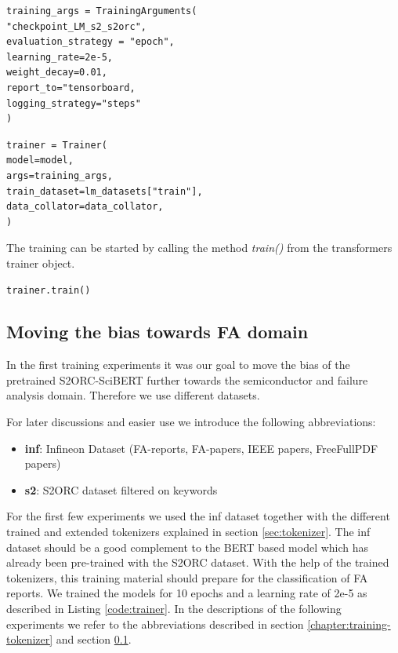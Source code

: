 \begin{code}
	\label{code:train_args}
\begin{verbatim}
training_args = TrainingArguments(
"checkpoint_LM_s2_s2orc",
evaluation_strategy = "epoch",
learning_rate=2e-5,
weight_decay=0.01,
report_to="tensorboard,
logging_strategy="steps"
)
\end{verbatim}
\end{code}

\begin{code}
	\label{code:trainer}
\begin{verbatim}
trainer = Trainer(
model=model,
args=training_args,
train_dataset=lm_datasets["train"],
data_collator=data_collator,
)
\end{verbatim}
\end{code}

The training can be started by calling the method \textit{train()} from the transformers trainer object.
\begin{code}
	\label{code:train}
\begin{verbatim}
trainer.train()
\end{verbatim}
\end{code}

\subsection{Moving the bias towards FA domain}\label{chapter:training-experiments}
In the first training experiments it was our goal to move the bias of the pretrained S2ORC-SciBERT further towards the semiconductor and failure analysis domain. Therefore we use different datasets. 

For later discussions and easier use we introduce the following abbreviations:
\begin{itemize}
	\item \textbf{inf}: Infineon Dataset (FA-reports, FA-papers, IEEE papers, FreeFullPDF papers)
	\item \textbf{s2}: S2ORC dataset filtered on keywords
\end{itemize}

For the first few experiments we used the inf dataset together with the different trained and extended tokenizers explained in section \ref{sec:tokenizer}. The inf dataset should be a good complement to the BERT based model which has already been pre-trained with the S2ORC dataset. With the help of the trained tokenizers, this training material should prepare for the classification of FA reports. We trained the models for 10 epochs and a learning rate of 2e-5 as described in Listing \ref{code:trainer}. In the descriptions of the following experiments we refer to the abbreviations described in section \ref{chapter:training-tokenizer} and section \ref{chapter:training-experiments}. \newline

